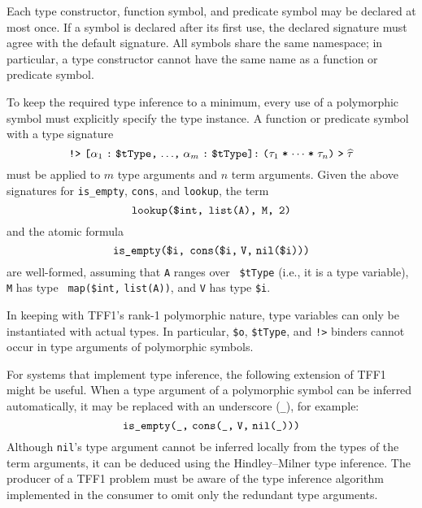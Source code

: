 Each type constructor, function symbol, and predicate symbol may be declared at
most once. If a symbol is declared after its first use, the declared signature
must agree with the default signature. All symbols share the same namespace; in
particular, a type constructor cannot have the same name as a function or
predicate symbol.


 To keep the required type
inference to a minimum, every use of a polymorphic symbol must explicitly
specify the type instance. A function or predicate symbol with a type signature
\[\hbox{{\tt !>} {\tt [$\alpha_1$\;:\;\$tType,\;${\dots}$,\;$\alpha_m$\;:\;\$tType]:\;%
($\tau_1$\;*\;${\cdots}$\;*\;$\tau_n$)\;>\;$\widehat \tau$}}\]
must be applied to $m$ type arguments and $n$ term arguments. Given the above
signatures for {\tt is\_empty}, {\tt cons}, and {\tt lookup}, the term
\[\hbox{\tt lookup(\$int,\;\,list(A),\;\,M,\;\,2)}\]
and the atomic formula
\[\hbox{\tt is\_empty(\$i,\;\,cons(\$i,\;V,\;nil(\$i)))}\]
are well-formed, assuming that {\tt A} ranges over {\tt
\$tType} (i.e., it is a type variable), {\tt M} has type {\tt
map(\$int,} {\tt list(A))}, and {\tt V} has type {\tt \$i}.

In keeping with TFF1's rank-1 polymorphic nature, type variables can only be
instantiated with actual types. In particular, \verb+$o+, \verb+$tType+,
and {\tt !>} binders cannot occur in type arguments of polymorphic symbols.

For systems that implement type inference, the following extension
of TFF1 might be useful. When a type argument of
a polymorphic symbol can be inferred automatically, it may be
replaced with an underscore ({\tt \_}), for example:
\[\hbox{{\tt is\_empty(\_,} {\tt cons(\_,\;V,\;nil(\_)))}}\]
Although {\tt nil}'s type argument cannot be inferred locally from the types of
the term arguments, it can be deduced using the Hindley--Milner type inference.
The producer of a TFF1 problem must be aware of the type inference algorithm
implemented in the consumer to omit only the redundant type arguments.

